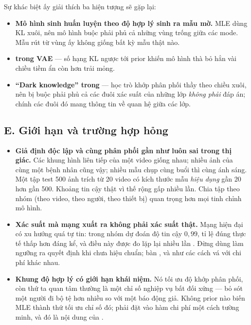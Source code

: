 \documentclass[../../../deep_learning.tex]{subfiles}
\begin{document}
Sự khác biệt ấy giải thích ba hiện tượng sẽ gặp lại:


\begin{itemize}
\item \textbf{Mô hình sinh huấn luyện theo độ hợp lý sinh ra mẫu mờ.} MLE dùng KL xuôi, nên mô hình buộc phải phủ cả những vùng trống giữa các mode. Mẫu rút từ vùng ấy không giống bất kỳ mẫu thật nào.
\item \textbf{ trong VAE} \cite{kingma2014vae} --- số hạng KL ngược tới prior khiến mô hình thà bỏ hẳn vài chiều tiềm ẩn còn hơn trải mỏng.
\item \textbf{``Dark knowledge'' trong } \cite{hinton2015distilling} --- học trò khớp phân phối thầy theo chiều xuôi, nên bị buộc phải phủ cả các đuôi xác suất của những lớp \emph{không phải} đáp án; chính các đuôi đó mang thông tin về quan hệ giữa các lớp.
\end{itemize}

\subsection{E. Giới hạn và trường hợp hỏng}
\begin{itemize}
\item \textbf{Giả định độc lập và cùng phân phối gần như luôn sai trong thị giác.} Các khung hình liên tiếp của một video giống nhau; nhiều ảnh của cùng một bệnh nhân cũng vậy; nhiều mẫu chụp cùng buổi thì cùng ánh sáng. Một tập test 500 ảnh trích từ 20 video có kích thước mẫu \emph{hiệu dụng} gần 20 hơn gần 500. Khoảng tin cậy thật vì thế rộng gấp nhiều lần. Chia tập theo nhóm (theo video, theo người, theo thiết bị) quan trọng hơn mọi tinh chỉnh mô hình.
\item \textbf{Xác suất mà mạng xuất ra không phải xác suất thật.} Mạng hiện đại có xu hướng quá tự tin: trong nhóm dự đoán độ tin cậy \(0{,}99\), tỉ lệ đúng thực tế thấp hơn đáng kể, và điều này được đo lặp lại nhiều lần \cite{guo2017calibration}. 
Đừng dùng  làm ngưỡng ra quyết định khi chưa hiệu chuẩn;  bàn ,  và  \cite{angelopoulos2023conformal} như các cách vá với chi phí khác nhau.
\item \textbf{Khung độ hợp lý có giới hạn khái niệm.} Nó tối ưu độ khớp phân phối, còn thứ ta quan tâm thường là một chỉ số nghiệp vụ bất đối xứng --- bỏ sót một người đi bộ tệ hơn nhiều so với một báo động giả. Không prior nào biến MLE thành thứ tối ưu chỉ số đó; phải đặt vào hàm chi phí một cách tường minh, và đó là nội dung của .
\end{itemize}
\end{document}
